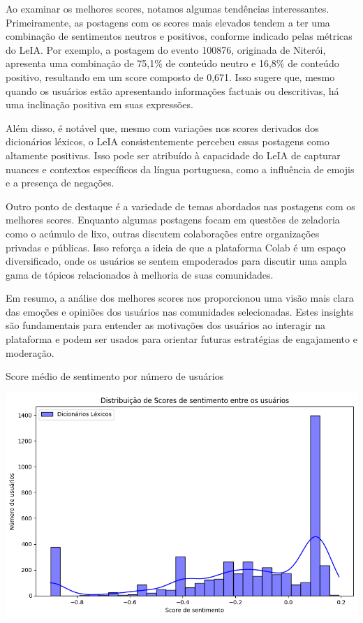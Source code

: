 Ao examinar os melhores scores, notamos algumas tendências interessantes. Primeiramente, as postagens com os scores mais elevados tendem a ter uma combinação de sentimentos neutros e positivos, conforme indicado pelas métricas do LeIA. Por exemplo, a postagem do evento 100876, originada de Niterói, apresenta uma combinação de 75,1\% de conteúdo neutro e 16,8\% de conteúdo positivo, resultando em um score composto de 0,671. Isso sugere que, mesmo quando os usuários estão apresentando informações factuais ou descritivas, há uma inclinação positiva em suas expressões.

Além disso, é notável que, mesmo com variações nos scores derivados dos dicionários léxicos, o LeIA consistentemente percebeu essas postagens como altamente positivas. Isso pode ser atribuído à capacidade do LeIA de capturar nuances e contextos específicos da língua portuguesa, como a influência de emojis e a presença de negações.

Outro ponto de destaque é a variedade de temas abordados nas postagens com os melhores scores. Enquanto algumas postagens focam em questões de zeladoria como o acúmulo de lixo, outras discutem colaborações entre organizações privadas e públicas. Isso reforça a ideia de que a plataforma Colab é um espaço diversificado, onde os usuários se sentem empoderados para discutir uma ampla gama de tópicos relacionados à melhoria de suas comunidades.

Em resumo, a análise dos melhores scores nos proporcionou uma visão mais clara das emoções e opiniões dos usuários nas comunidades selecionadas. Estes insights são fundamentais para entender as motivações dos usuários ao interagir na plataforma e podem ser usados para orientar futuras estratégias de engajamento e moderação.

\begin{quadro}[!htb]
	\caption{Score médio de sentimento por número de usuários}
	\label{fig:average_score_by_number_of_users}
	\centering
	\includegraphics[scale=0.70]{images/average_score_by_number_of_users.png}
	\fautor
\end{quadro}

